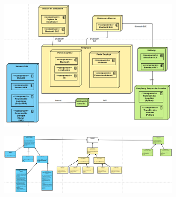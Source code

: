 \documentclass[10pt,a4paper]{article}
\begin{document}
\begin{figure}[h!]
    \centering
    \begin{subfigure}[b]{0.45\textwidth}
        \centering
        \includegraphics[scale=0.14]{Images/diagramme_deploiement.png}
        \caption{}
        \label{diagramme_deploiement}
    \end{subfigure}
    \begin{subfigure}[b]{0.45\textwidth}
        \includegraphics[scale=0.14]{Images/diagramme_exigence1.png}
        \caption{}
        \label{diagramme_exigences1}
    \end{subfigure}
    \caption{}
\end{figure}
\end{document}
